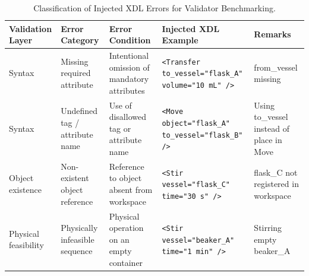 \documentclass{ieeeaccess}
\begin{document}
\begin{table}[!t]
\centering
\caption{Classification of Injected XDL Errors for Validator Benchmarking.}\label{tab:xdl_injected_errors}
\begin{tabular}{@{}p{0.15\dimexpr\linewidth-8\tabcolsep\relax}p{0.175\dimexpr\linewidth-8\tabcolsep\relax}p{0.2\dimexpr\linewidth-8\tabcolsep\relax}p{0.275\dimexpr\linewidth-8\tabcolsep\relax}p{0.2\dimexpr\linewidth-8\tabcolsep\relax}@{}}
\toprule
Validation Layer & Error Category & Error Condition & Injected XDL Example & Remarks \\
\midrule
Syntax & Missing required attribute & Intentional omission of mandatory attributes & \texttt{<Transfer to\_vessel="flask\_A" volume="10 mL" />} & from\_vessel \newline missing \\
\addlinespace
Syntax & Undefined tag / attribute name & Use of disallowed tag or attribute name & \texttt{<Move object="flask\_A" to\_vessel="flask\_B" />} & Using to\_vessel \newline instead of place \newline in Move \\
\addlinespace
Object \newline existence & Non-existent object reference & Reference to object absent from workspace & \texttt{<Stir vessel="flask\_C" time="30 s" />} & flask\_C \newline not registered \newline in workspace \\
\addlinespace
Physical \newline feasibility & Physically \newline infeasible sequence & Physical operation on an empty container & \texttt{<Stir vessel="beaker\_A" time="1 min" />} & Stirring \newline empty \newline beaker\_A \\
\bottomrule
\end{tabular}
\end{table}
\end{document}

